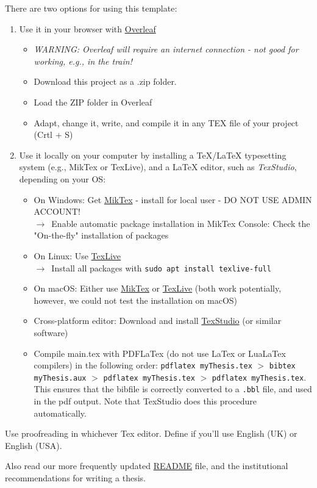 \documentclass[12pt,oneside]{article}
\begin{document}
	There are two options for using this template:
	\begin{enumerate}
		\item Use it in your browser with \href{https://www.overleaf.com/}{Overleaf}
			\begin{itemize}
				\item[] \textit{WARNING: Overleaf will require an internet connection - not good for working, e.g., in the train!}
				\item Download this project as a .zip folder.
				\item Load the ZIP folder in Overleaf
				\item Adapt, change it, write, and compile it in any TEX file of your project (Crtl + S)
			\end{itemize}
		\item Use it locally on your computer by installing a TeX/LaTeX typesetting system (e.g., MikTex or TexLive), and a LaTeX editor, such as \textit{TexStudio}, depending on your OS:
			\begin{itemize}
				\item On Windows: Get \href{https://miktex.org/howto/install-miktex}{MikTex} - install for local user - DO NOT USE ADMIN ACCOUNT!
				\\ $\rightarrow$~Enable automatic package installation in MikTex Console: Check the "On-the-fly" installation of packages
				\item On Linux: Use \href{https://en.wikipedia.org/wiki/TeX_Live}{TexLive}\\ $\rightarrow$~Install all packages with \texttt{sudo apt install texlive-full}
				\item On macOS: Either use \href{https://miktex.org/howto/install-miktex}{MikTex} or \href{https://en.wikipedia.org/wiki/TeX_Live}{TexLive} (both work potentially, however, we could not test the installation on macOS)
				\item Cross-platform editor: Download and install \href{https://www.texstudio.org/}{TexStudio} (or similar software)
				\item Compile main.tex with PDFLaTex (do not use LaTex or LuaLaTex compilers) in the following order: \texttt{pdflatex myThesis.tex} $>$ \texttt{bibtex myThesis.aux} $>$ \texttt{pdflatex myThesis.tex} $>$ \texttt{pdflatex myThesis.tex}. This ensures that the bibfile is correctly converted to a \texttt{.bbl} file, and used in the pdf output. Note that TexStudio does this procedure automatically.
			\end{itemize} 
	\end{enumerate}

	 Use proofreading in whichever Tex editor. Define if you'll use English (UK) or English (USA).
	 
	 Also read our more frequently updated \href{https://github.com/Ecohydraulics/latex-thesis-template/blob/main/README.md}{README} file, and the institutional recommendations for writing a thesis.
\end{document}
